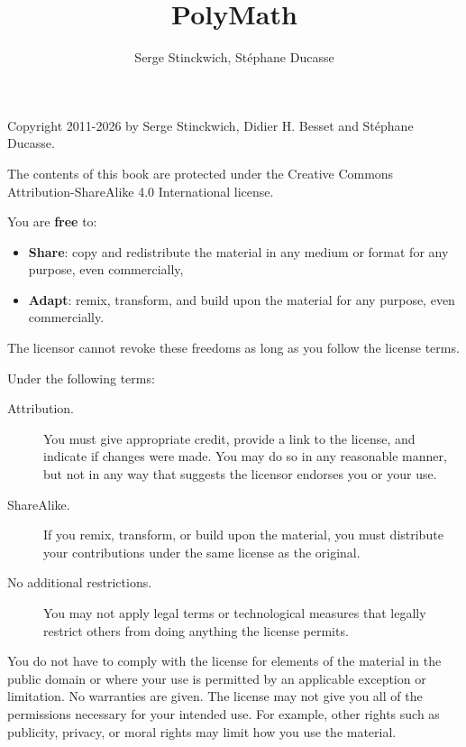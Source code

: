 \documentclass[english,twoside,openany,showtrims]{sbabook}
\title{PolyMath}
\author{Serge Stinckwich, Stéphane Ducasse}
\date{\gitdate\titlebreak[\smallskip]{ -- }\protect\gitCommitInfo}
\begin{document}
\maketitle
\pagestyle{titlingpage}
\thispagestyle{titlingpage} %

\cleartoverso
{\small

  Copyright 2011-2026 by Serge Stinckwich, Didier H. Besset and Stéphane Ducasse.

  The contents of this book are protected under the Creative Commons
  Attribution-ShareAlike 4.0 International license.

  You are \textbf{free} to:
  \begin{itemize}
  \item \textbf{Share}: copy and redistribute the material in any medium or
    format for any purpose, even commercially,
  \item \textbf{Adapt}: remix, transform, and build upon the material for any
    purpose, even commercially.
  \end{itemize}
  The licensor cannot revoke these freedoms as long as you follow the license
  terms.

  Under the following terms:
  \begin{description}
  \item[Attribution.] You must give appropriate credit, provide a link to the
    license, and indicate if changes were made. You may do so in any reasonable
    manner, but not in any way that suggests the licensor endorses you or your
    use.
  \item[ShareAlike.] If you remix, transform, or build upon the material, you
    must distribute your contributions under the same license as the original.
  \item[No additional restrictions.] You may not apply legal terms or
    technological measures that legally restrict others from doing anything the
    license permits.
  \end{description}

  You do not have to comply with the license for elements of the material in
  the public domain or where your use is permitted by an applicable exception
  or limitation. No warranties are given. The license may not give you all of
  the permissions necessary for your intended use. For example, other rights
  such as publicity, privacy, or moral rights may limit how you use the
  material.

}
\end{document}
